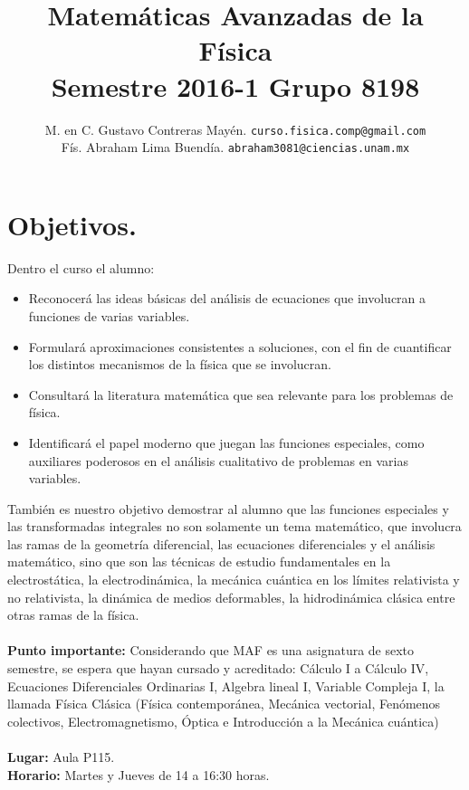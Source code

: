 \documentclass[12pt]{article}
\author{M. en C. Gustavo Contreras Mayén. \texttt{curso.fisica.comp@gmail.com}\\
Fís. Abraham Lima Buendía. \texttt{abraham3081@ciencias.unam.mx}}
\title{Matemáticas Avanzadas de la Física \\ {\large Semestre 2016-1 Grupo 8198}}
\date{ }
\begin{document}
\vspace{-4cm}
\renewcommand\labelenumii{\theenumi.{\arabic{enumii}}}
\maketitle
\fontsize{12}{12}\selectfont
\section{Objetivos.}
Dentro el curso el alumno:
\begin{itemize}
\setlength{\itemsep}{0mm}
\item Reconocerá las ideas básicas del análisis de ecuaciones que involucran a funciones de varias variables.
\item Formulará aproximaciones consistentes a soluciones, con el fin de cuantificar los distintos mecanismos de la física que se involucran.
\item Consultará la literatura matemática que sea relevante para los problemas de física.
\item Identificará el papel moderno que juegan las funciones especiales, como auxiliares poderosos en el análisis cualitativo de problemas en varias variables.
\end{itemize}
También es nuestro objetivo demostrar al alumno que las funciones especiales y las transformadas integrales no son solamente un tema matemático, que involucra las ramas de la geometría diferencial, las ecuaciones diferenciales y el análisis matemático, sino que son las técnicas de estudio fundamentales en la electrostática, la electrodinámica, la mecánica cuántica en los límites relativista y  no relativista, la dinámica de medios deformables, la hidrodinámica clásica entre otras ramas de la física.
\\
\\
\textbf{Punto importante: } Considerando que MAF es una asignatura de sexto semestre, se espera que hayan cursado y acreditado: Cálculo I a Cálculo IV, Ecuaciones Diferenciales Ordinarias I, Algebra lineal I, Variable Compleja I, la llamada Física Clásica (Física contemporánea, Mecánica vectorial, Fenómenos colectivos, Electromagnetismo, Óptica e Introducción a la Mecánica cuántica)
\\
\\
\textbf{Lugar: }Aula P115.
\\
\textbf{Horario: } Martes y Jueves de 14 a 16:30 horas.
\end{document}
